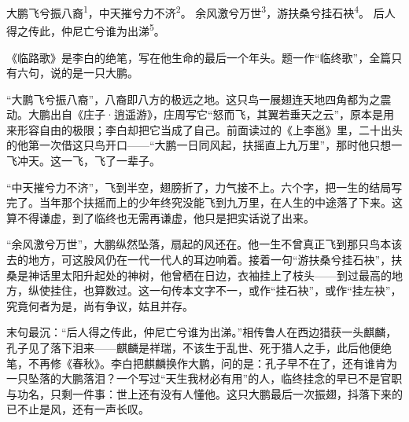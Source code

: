 
\begin{poem}
大鹏飞兮振八裔\textsuperscript{1}，中天摧兮力不济\textsuperscript{2}。
余风激兮万世\textsuperscript{3}，游扶桑兮挂石袂\textsuperscript{4}。
后人得之传此，仲尼亡兮谁为出涕\textsuperscript{5}。
\end{poem}

\begin{annotations}
\end{annotations}

\begin{appreciation}
《临路歌》是李白的绝笔，写在他生命的最后一个年头。题一作“临终歌”，全篇只有六句，说的是一只大鹏。

“大鹏飞兮振八裔”，八裔即八方的极远之地。这只鸟一展翅连天地四角都为之震动。大鹏出自《庄子·逍遥游》，庄周写它“怒而飞，其翼若垂天之云”，原本是用来形容自由的极限；李白却把它当成了自己。前面读过的《上李邕》里，二十出头的他第一次借这只鸟开口——“大鹏一日同风起，扶摇直上九万里”，那时他只想一飞冲天。这一飞，飞了一辈子。

“中天摧兮力不济”，飞到半空，翅膀折了，力气接不上。六个字，把一生的结局写完了。当年那个扶摇而上的少年终究没能飞到九万里，在人生的中途落了下来。这算不得谦虚，到了临终也无需再谦虚，他只是把实话说了出来。

“余风激兮万世”，大鹏纵然坠落，扇起的风还在。他一生不曾真正飞到那只鸟本该去的地方，可这股风仍在一代一代人的耳边响着。接着一句“游扶桑兮挂石袂”，扶桑是神话里太阳升起处的神树，他曾栖在日边，衣袖挂上了枝头——到过最高的地方，纵使挂住，也算数过。这一句传本文字不一，或作“挂石袂”，或作“挂左袂”，究竟何者为是，尚有争议，姑且并存。

末句最沉：“后人得之传此，仲尼亡兮谁为出涕。”相传鲁人在西边猎获一头麒麟，孔子见了落下泪来——麒麟是祥瑞，不该生于乱世、死于猎人之手，此后他便绝笔，不再修《春秋》。李白把麒麟换作大鹏，问的是：孔子早不在了，还有谁肯为一只坠落的大鹏落泪？一个写过“天生我材必有用”的人，临终挂念的早已不是官职与功名，只剩一件事：世上还有没有人懂他。这只大鹏最后一次振翅，抖落下来的已不止是风，还有一声长叹。
\end{appreciation}
